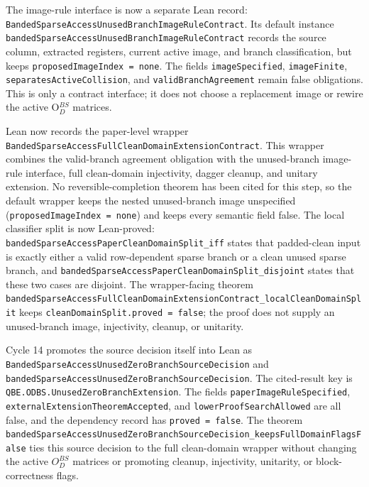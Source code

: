The image-rule interface is now a separate Lean record:
\texttt{BandedSparseAccessUnusedBranchImageRuleContract}.  Its default instance
\texttt{bandedSparseAccessUnusedBranchImageRuleContract} records the source
column, extracted registers, current active image, and branch classification,
but keeps \texttt{proposedImageIndex = none}.  The fields
\texttt{imageSpecified}, \texttt{imageFinite},
\texttt{separatesActiveCollision}, and \texttt{validBranchAgreement} remain
false obligations.  This is only a contract interface; it does not choose a
replacement image or rewire the active O$_D^{BS}$ matrices.

Lean now records the paper-level wrapper
\texttt{BandedSparseAccessFullCleanDomainExtensionContract}.  This wrapper
combines the valid-branch agreement obligation with the unused-branch image-rule
interface, full clean-domain injectivity, dagger cleanup, and unitary extension.
No reversible-completion theorem has been cited for this step, so the default
wrapper keeps the nested unused-branch image unspecified
(\texttt{proposedImageIndex = none}) and keeps every semantic field false.
The local classifier split is now Lean-proved:
\texttt{bandedSparseAccessPaperCleanDomainSplit\_iff} states that padded-clean
input is exactly either a valid row-dependent sparse branch or a clean unused
sparse branch, and
\texttt{bandedSparseAccessPaperCleanDomainSplit\_disjoint} states that these
two cases are disjoint.  The wrapper-facing theorem
\texttt{bandedSparseAccessFullCleanDomainExtensionContract\_localCleanDomainSplit}
keeps \texttt{cleanDomainSplit.proved = false}; the proof does not supply an
unused-branch image, injectivity, cleanup, or unitarity.

Cycle 14 promotes the source decision itself into Lean as
\texttt{BandedSparseAccessUnusedZeroBranchSourceDecision} and
\texttt{bandedSparseAccessUnusedZeroBranchSourceDecision}.  The cited-result
key is \texttt{QBE.ODBS.UnusedZeroBranchExtension}.  The fields
\texttt{paperImageRuleSpecified},
\texttt{externalExtensionTheoremAccepted}, and
\texttt{lowerProofSearchAllowed} are all false, and the dependency record has
\texttt{proved = false}.  The theorem
\texttt{bandedSparseAccessUnusedZeroBranchSourceDecision\_keepsFullDomainFlagsFalse}
ties this source decision to the full clean-domain wrapper without changing the
active $O_D^{BS}$ matrices or promoting cleanup, injectivity, unitarity, or
block-correctness flags.

